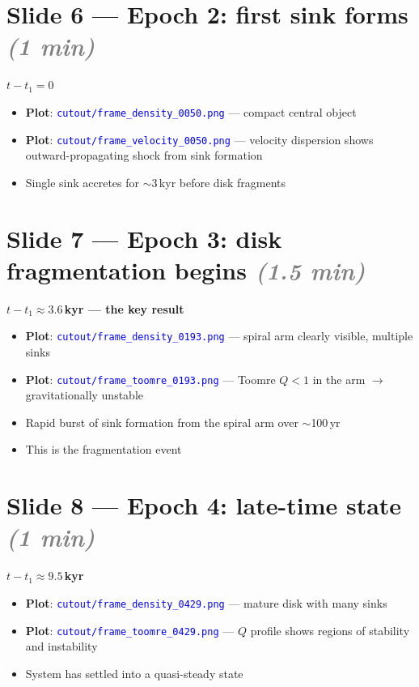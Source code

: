 \documentclass[12pt]{article}
\newcommand{\plotref}[1]{\textcolor{blue}{\texttt{#1}}}
\newcommand{\timing}[1]{\textcolor{gray}{\textit{(#1)}}}
\begin{document}
\section*{Slide 6 --- Epoch 2: first sink forms \timing{1 min}}

\textbf{$t - t_1 = 0$}

\begin{itemize}
  \item \textbf{Plot}: \plotref{cutout/frame\_density\_0050.png} ---
        compact central object
  \item \textbf{Plot}: \plotref{cutout/frame\_velocity\_0050.png} ---
        velocity dispersion shows outward-propagating shock from sink
        formation
  \item Single sink accretes for $\sim$3\,kyr before disk fragments
\end{itemize}

\section*{Slide 7 --- Epoch 3: disk fragmentation begins \timing{1.5 min}}

\textbf{$t - t_1 \approx 3.6$\,kyr --- the key result}

\begin{itemize}
  \item \textbf{Plot}: \plotref{cutout/frame\_density\_0193.png} ---
        spiral arm clearly visible, multiple sinks
  \item \textbf{Plot}: \plotref{cutout/frame\_toomre\_0193.png} ---
        Toomre $Q < 1$ in the arm $\to$ gravitationally unstable
  \item Rapid burst of sink formation from the spiral arm over
        $\sim$100\,yr
  \item This is the fragmentation event
\end{itemize}

\section*{Slide 8 --- Epoch 4: late-time state \timing{1 min}}

\textbf{$t - t_1 \approx 9.5$\,kyr}

\begin{itemize}
  \item \textbf{Plot}: \plotref{cutout/frame\_density\_0429.png} ---
        mature disk with many sinks
  \item \textbf{Plot}: \plotref{cutout/frame\_toomre\_0429.png} ---
        $Q$ profile shows regions of stability and instability
  \item System has settled into a quasi-steady state
\end{itemize}
\end{document}
